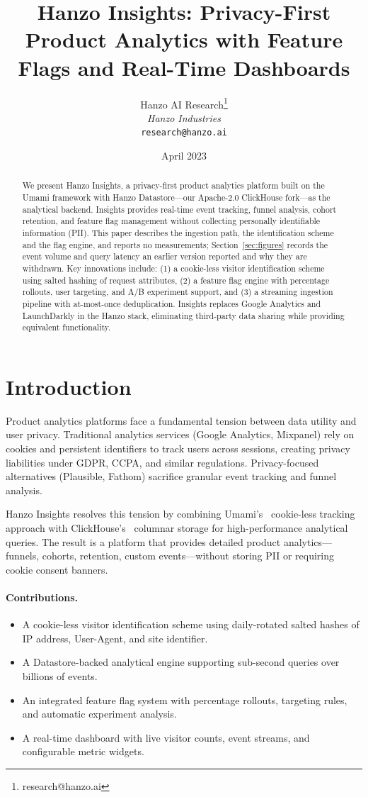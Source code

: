 \documentclass[11pt,twocolumn]{article}
\title{Hanzo Insights: Privacy-First Product Analytics with Feature Flags and Real-Time Dashboards}
\author{Hanzo AI Research\thanks{research@hanzo.ai} \\ \textit{Hanzo Industries} \\ \texttt{research@hanzo.ai}}
\date{April 2023}
\begin{document}
\hanzocoverpage

\begin{abstract}
We present Hanzo Insights, a privacy-first product analytics platform built on the Umami framework with Hanzo Datastore---our Apache-2.0 ClickHouse fork---as the analytical backend. Insights provides real-time event tracking, funnel analysis, cohort retention, and feature flag management without collecting personally identifiable information (PII). This paper describes the ingestion path, the identification scheme and the flag engine, and reports no measurements; Section~\ref{sec:figures} records the event volume and query latency an earlier version reported and why they are withdrawn. Key innovations include: (1) a cookie-less visitor identification scheme using salted hashing of request attributes, (2) a feature flag engine with percentage rollouts, user targeting, and A/B experiment support, and (3) a streaming ingestion pipeline with at-most-once deduplication. Insights replaces Google Analytics and LaunchDarkly in the Hanzo stack, eliminating third-party data sharing while providing equivalent functionality.
\end{abstract}

\section{Introduction}

Product analytics platforms face a fundamental tension between data utility and user privacy. Traditional analytics services (Google Analytics, Mixpanel) rely on cookies and persistent identifiers to track users across sessions, creating privacy liabilities under GDPR, CCPA, and similar regulations. Privacy-focused alternatives (Plausible, Fathom) sacrifice granular event tracking and funnel analysis.

Hanzo Insights resolves this tension by combining Umami's~\cite{umami2020} cookie-less tracking approach with ClickHouse's~\cite{clickhouse2016} columnar storage for high-performance analytical queries. The result is a platform that provides detailed product analytics---funnels, cohorts, retention, custom events---without storing PII or requiring cookie consent banners.

\paragraph{Contributions.}
\begin{itemize}
    \item A cookie-less visitor identification scheme using daily-rotated salted hashes of IP address, User-Agent, and site identifier.
    \item A Datastore-backed analytical engine supporting sub-second queries over billions of events.
    \item An integrated feature flag system with percentage rollouts, targeting rules, and automatic experiment analysis.
    \item A real-time dashboard with live visitor counts, event streams, and configurable metric widgets.
\end{itemize}
\end{document}

